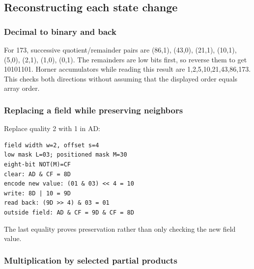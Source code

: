\subsection{Reconstructing each state change}\label{appendix-92ff77d4dfdc-reconstructing-each-state-change}

\hypertarget{appendix-92ff77d4dfdc-reconstructing-each-state-change}{}

\subsubsection{Decimal to binary and back}\label{appendix-92ff77d4dfdc-decimal-to-binary-and-back}

\hypertarget{appendix-92ff77d4dfdc-decimal-to-binary-and-back}{}

For 173, successive quotient/remainder pairs are (86,1), (43,0), (21,1), (10,1), (5,0), (2,1), (1,0), (0,1). The remainders are low bits first, so reverse them to get 10101101. Horner accumulators while reading this result are 1,2,5,10,21,43,86,173. This checks both directions without assuming that the displayed order equals array order.

\subsubsection{Replacing a field while preserving neighbors}\label{appendix-92ff77d4dfdc-replacing-a-field-while-preserving-neighbors}

\hypertarget{appendix-92ff77d4dfdc-replacing-a-field-while-preserving-neighbors}{}

Replace quality 2 with 1 in AD:

\begin{verbatim}
field width w=2, offset s=4
low mask L=03; positioned mask M=30
eight-bit NOT(M)=CF
clear: AD & CF = 8D
encode new value: (01 & 03) << 4 = 10
write: 8D | 10 = 9D
read back: (9D >> 4) & 03 = 01
outside field: AD & CF = 9D & CF = 8D
\end{verbatim}

The last equality proves preservation rather than only checking the new field value.

\subsubsection{Multiplication by selected partial products}\label{appendix-92ff77d4dfdc-multiplication-by-selected-partial-products}

\hypertarget{appendix-92ff77d4dfdc-multiplication-by-selected-partial-products}{}

